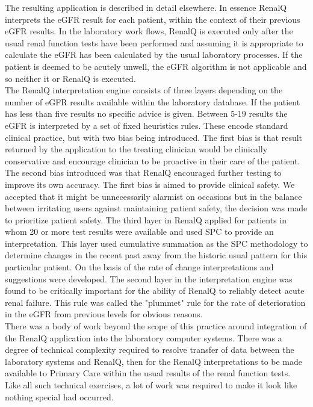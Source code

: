 \documentclass[11pt]{article}
\begin{document}
The resulting application is described in detail elsewhere\citep{GodfreyEtAl2014KidneyPaper}. In essence RenalQ interprets the eGFR result for each patient, within the context of their previous eGFR results. In the laboratory work flows, RenalQ is executed only after the usual renal function tests have been performed and assuming it is appropriate to calculate the eGFR has been calculated by the usual laboratory processes. If the patient is deemed to be acutely unwell, the eGFR algorithm is not applicable and so neither it or RenalQ is executed.\\

The RenalQ interpretation engine consists of three layers depending on the number of eGFR results available within the laboratory database. If the patient has less than five results no specific advice is given. Between 5-19 results the eGFR is interpreted by a set of fixed heuristics rules. These encode standard clinical practice, but with two bias being introduced. The first bias is that result returned by the application to the treating clinician would be clinically conservative and encourage clinician to be proactive in their care of the patient. The second bias introduced was that RenalQ encouraged further testing to improve its own accuracy. The first bias is aimed to provide clinical safety. We accepted that it might be unnecessarily alarmist on occasions but in the balance between irritating users against maintaining patient safety, the decision was made to prioritize patient safety. The third layer in RenalQ applied for patients in whom 20 or more test results were available and used SPC to provide an interpretation. This layer used cumulative summation as the SPC methodology to determine changes in the recent past away from the historic usual pattern for this particular patient. On the basis of the rate of change interpretations and suggestions were developed. The second layer in the interpretation engine was found to be critically important for the ability of RenalQ to reliably detect acute renal failure. This rule was called the "plummet" rule for the rate of deterioration in the eGFR from previous levels for obvious reasons. \\

There was a body of work beyond the scope of this practice around integration of the RenalQ application into the laboratory computer systems. There was a degree of technical complexity required to resolve transfer of data between the laboratory systems and RenalQ, then for the RenalQ interpretations to be made available to Primary Care within the usual results of the renal function tests. Like all such technical exercises, a lot of work was required to make it look like nothing special had occurred. \\
\end{document}

